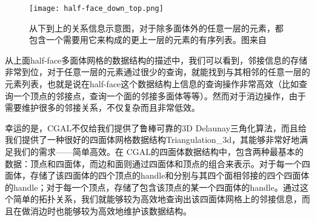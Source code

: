 \begin{figure}[htbp]
    \centering
    \texttt{[image: half-face\_down\_top.png]}
    \caption[half-face从下到上的关系]{从下到上的关系信息示意图，对于除多面体外的任意一层的元素，都包含一个需要用它来构成的更上一层的元素的有序列表。图来自\cite{open-volume-mesh}}
    \label{fig:half-face-down-top}
\end{figure}
从上面half-face多面体网格的数据结构的描述中，我们可以看到，邻接信息的存储非常到位，对于任意一层的元素通过很少的查询，就能找到与其相邻的任意一层的元素列表，也就是说在half-face这个数据结构上信息的查询操作非常高效（比如查询一个顶点的邻接点，查询一个面的邻接多面体等等）。然而对于消边操作，由于需要维护很多的邻接关系，不仅复杂而且非常低效。\par
幸运的是，CGAL不仅给我们提供了鲁棒可靠的3D Delaunay三角化算法，而且给我们提供了一种很好的四面体网格数据结构Triangulation\_3d，其能够非常好地满足我们的需求——简单高效。在 CGAL的四面体数据结构中，包含两种最基本的数据：顶点和四面体，而边和面则通过四面体和顶点的组合来表示。对于每一个四面体，存储了该四面体的四个顶点的handle和分别与其四个面相邻接的四个四面体的handle；对于每一个顶点，存储了包含该顶点的某一个四面体的handle。通过这个简单的拓扑关系，我们就能够较为高效地查询出该四面体网格上的邻接信息，而且在做消边时也能够较为高效地维护该数据结构。

